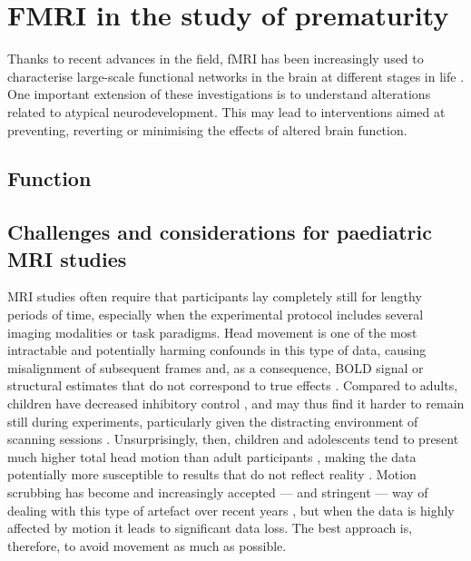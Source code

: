 \section{FMRI in the study of prematurity}
\label{sub:fMRI_in_preterm}


Thanks to recent advances in the field, fMRI has been increasingly used to characterise large-scale functional networks in the brain at different stages in life \cite{Power2010}. 
One important extension of these investigations is to understand alterations related to atypical neurodevelopment. 
This may lead to interventions aimed at preventing, reverting or minimising the effects of altered brain function.


\subsection{Function} %
\subsection{Challenges and considerations for paediatric MRI studies}


MRI studies often require that participants lay completely still for lengthy periods of time, especially when the experimental protocol includes several imaging modalities or task paradigms. Head movement is one of the most intractable and potentially harming confounds in this type of data, causing misalignment of subsequent frames and, as a consequence, BOLD signal or structural estimates that do not correspond to true effects \citep{Friston1996, Siegel2017}. Compared to adults, children have decreased inhibitory control \citep{Bedard2002}, and may thus find it harder to remain still during experiments, particularly  given the distracting environment of scanning sessions \citep{Greene2016}. Unsurprisingly, then, children and adolescents tend to present much higher total head motion than adult participants \citep{Satterthwaite2013b}, making the data potentially more susceptible to results that do not reflect reality \citep{Power2012}. Motion scrubbing has become and increasingly accepted --- and stringent --- way of dealing with this type of artefact over recent years \citep{Power2014a,Laumann2016}, but when the data is highly affected by motion it leads to significant data loss. The best approach is, therefore, to avoid movement as much as possible.

